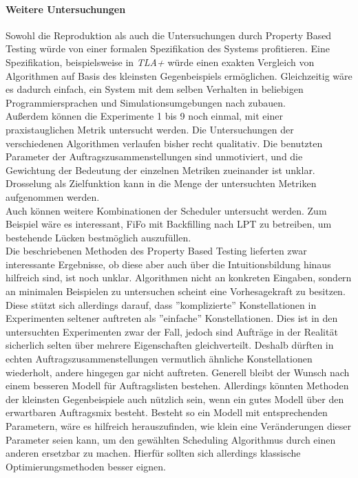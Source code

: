\paragraph{Weitere Untersuchungen}
Sowohl die Reproduktion als auch die Untersuchungen durch Property Based Testing würde von einer formalen Spezifikation des Systems profitieren. Eine Spezifikation, beispielsweise in \emph{TLA+} würde einen exakten Vergleich von Algorithmen auf Basis des kleinsten Gegenbeispiels ermöglichen. Gleichzeitig wäre es dadurch einfach, ein System mit dem selben Verhalten in beliebigen Programmiersprachen und Simulationsumgebungen nach zubauen.\\
Außerdem können die Experimente 1 bis 9 noch einmal, mit einer praxistauglichen Metrik untersucht werden. Die Untersuchungen der verschiedenen Algorithmen verlaufen bisher recht qualitativ. Die benutzten Parameter der Auftragszusammenstellungen sind unmotiviert, und die Gewichtung der Bedeutung der einzelnen Metriken zueinander ist unklar. Drosselung als Zielfunktion kann in die Menge der untersuchten Metriken aufgenommen werden.\\
Auch können weitere Kombinationen der Scheduler untersucht werden. Zum Beispiel wäre es interessant, FiFo mit Backfilling nach LPT zu betreiben, um bestehende Lücken bestmöglich auszufüllen.\\
Die beschriebenen Methoden des Property Based Testing lieferten zwar interessante Ergebnisse, ob diese aber auch über die Intuitionsbildung hinaus hilfreich sind, ist noch unklar. Algorithmen nicht an konkreten Eingaben, sondern an minimalen Beispielen zu untersuchen scheint eine Vorhesagekraft zu besitzen. Diese stützt sich allerdings darauf, dass ''komplizierte'' Konstellationen in Experimenten seltener auftreten als ''einfache'' Konstellationen. Dies ist in den untersuchten Experimenten zwar der Fall, jedoch sind Aufträge in der Realität sicherlich selten über mehrere Eigenschaften gleichverteilt. Deshalb dürften in echten Auftragszusammenstellungen vermutlich ähnliche Konstellationen wiederholt, andere hingegen gar nicht auftreten. Generell bleibt der Wunsch nach einem besseren Modell für Auftragslisten bestehen. Allerdings könnten  Methoden der kleinsten Gegenbeispiele auch nützlich sein, wenn ein gutes Modell über den erwartbaren Auftragsmix besteht. Besteht so ein Modell mit entsprechenden Parametern, wäre es hilfreich herauszufinden, wie klein eine Veränderungen dieser Parameter seien kann, um den gewählten Scheduling Algorithmus durch einen anderen ersetzbar zu machen. Hierfür sollten sich allerdings klassische Optimierungsmethoden besser eignen. 